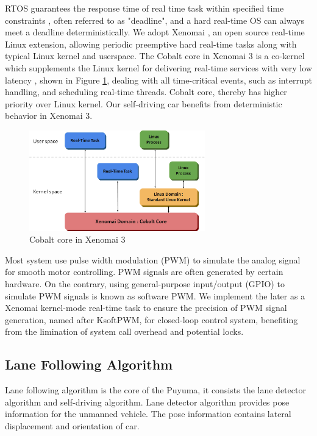 \documentclass[conference]{IEEEtran}
\begin{document}
RTOS guarantees the response time of real time task within specified time constraints \cite{RTOS}, often referred to as "deadline", and a hard real-time OS can always meet a deadline deterministically. We adopt Xenomai \cite{Xenomai}, an open source real-time Linux extension, allowing periodic preemptive hard real-time tasks along with typical Linux kernel and userspace. The Cobalt core in Xenomai 3 is a co-kernel which supplements the Linux kernel for delivering real-time services with very low latency \cite{rtlws2015}, shown in Figure \ref{fig:xeno_arch}, dealing with all time-critical events, such as interrupt handling, and scheduling real-time threads. Cobalt core, thereby has higher priority over Linux kernel. Our self-driving car benefits from deterministic behavior in Xenomai 3.

\begin{figure}
	\centering
	\includegraphics[width=3in]{img/xeno_arch.png}
	\caption{Cobalt core in Xenomai 3}
	\label{fig:xeno_arch}
\end{figure}

Most system use pulse width modulation (PWM) to simulate the analog signal for smooth motor controlling. PWM signals are often generated by certain hardware. On the contrary, using general-purpose input/output (GPIO) to simulate PWM signals is known as software PWM. We implement the later as a Xenomai kernel-mode real-time task to ensure the precision of PWM signal generation, named after KsoftPWM, for closed-loop control system, benefiting from the limination of system call overhead and potential locks.

\subsection{Lane Following Algorithm}

Lane following algorithm is the core of the Puyuma, it consists the lane detector algorithm and self-driving algorithm. Lane detector algorithm provides pose information for the unmanned vehicle. The pose information contains lateral displacement and orientation of car.
\end{document}
